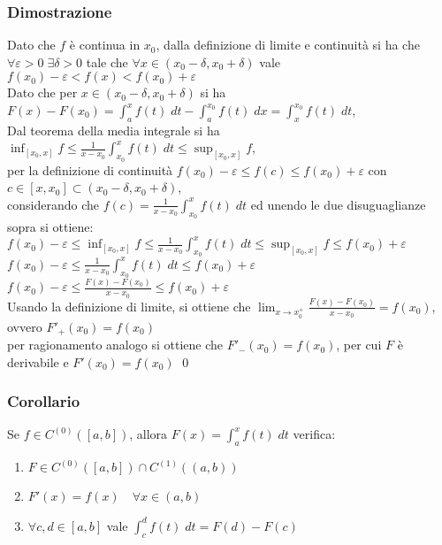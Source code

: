 \documentclass[a4paper]{article}
\newcommand\cont[2]{C^{(#1)} \left({#2}\right)}
\begin{document}
\subsubsection*{Dimostrazione}
Dato che \(f\) è continua in \(x_0\), dalla definizione di limite e continuità si ha che \(\forall \varepsilon > 0 \; \exists \delta > 0\)
tale che \(\forall x \in \left(x_0 - \delta, x_0 + \delta\right)\) vale \(f(x_0) - \varepsilon < f(x) < f(x_0) + \varepsilon\) \\
Dato che per \(x \in \left(x_0 - \delta, x_0 + \delta\right)\) si ha \(\displaystyle F(x) - F(x_0) = \int_{a}^{x} f(t)\; dt - \int_{a}^{x_0} f(t) \; dx = \int_{x}^{x_0} f(t)\; dt\), \\
Dal teorema della media integrale si ha \(\displaystyle \inf_{\left[x_0, x\right]} f \leq \frac{1}{x-x_0} \int_{x_0}^{x} f(t)\; dt \leq \sup_{\left[x_0, x\right]} f\), \\
per la definizione di continuità \(\displaystyle f(x_0) - \varepsilon \leq f(c) \leq f(x_0) + \varepsilon\) con \(c \in \left[x, x_0\right] \subset \left(x_0 - \delta, x_0 + \delta\right)\), \\
considerando che \(\displaystyle f(c) = \frac{1}{x-x_0} \int_{x_0}^{x} f(t)\; dt\) ed unendo le due disuguaglianze sopra si ottiene: \\
\(\displaystyle f(x_0) - \varepsilon \leq \inf_{\left[x_0, x\right]} f \leq \frac{1}{x-x_0} \int_{x_0}^{x} f(t)\; dt \leq \sup_{\left[x_0, x\right]} f \leq f(x_0) + \varepsilon\) \\
\(\displaystyle f(x_0) - \varepsilon \leq \frac{1}{x-x_0} \int_{x_0}^{x} f(t)\; dt \leq f(x_0) + \varepsilon\) \\
\(\displaystyle f(x_0) - \varepsilon \leq \frac{F(x) - F(x_0)}{x-x_0} \leq f(x_0) + \varepsilon\) \\
Usando la definizione di limite, si ottiene che \(\displaystyle \lim_{x \to x_0^+} \frac{F(x) - F(x_0)}{x - x_0} = f(x_0)\), ovvero \(F'_+(x_0) = f(x_0)\) \\
per ragionamento analogo si ottiene che \(F'_-(x_0) = f(x_0)\), per cui \(F\) è derivabile e \(F'(x_0) = f(x_0)\) \qed

\subsubsection*{Corollario}
Se \(f \in \cont{0}{\left[a, b\right]}\), allora \(\displaystyle F(x) = \int_{a}^{x} f(t)\; dt\) verifica:
\begin{enumerate}
	\item \(F \in \cont{0}{\left[a, b\right]} \cap \cont{1}{\left(a, b\right)}\)
	\item \(F'(x) = f(x) \quad \forall x \in \left(a, b\right)\)
	\item \(\forall c, d \in \left[a, b\right]\) vale \(\displaystyle \int_{c}^{d} f(t)\; dt = F(d) - F(c)\)
\end{enumerate}
\end{document}

